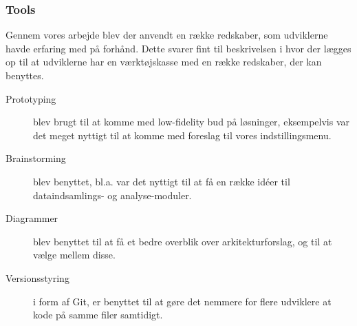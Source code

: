 \subsubsection{Tools}
Gennem vores arbejde blev der anvendt en række redskaber, som udviklerne havde erfaring med på forhånd.
Dette svarer fint til beskrivelsen i \citet[Kapitel 7]{book:softwareinnovation} hvor der lægges op til at udviklerne har en værktøjskasse med en række redskaber, der kan benyttes.

\begin{description}
	\item[Prototyping] blev brugt til at komme med low-fidelity bud på løsninger, eksempelvis var det meget nyttigt til at komme med foreslag til vores indstillingsmenu.
	\item[Brainstorming] blev benyttet, bl.a. var det nyttigt til at få en række idéer til dataindsamlings- og analyse-moduler.
	\item[Diagrammer] blev benyttet til at få et bedre overblik over arkitekturforslag, og til at vælge mellem disse.
	\item[Versionsstyring] i form af Git, er benyttet til at gøre det nemmere for flere udviklere at kode på samme filer samtidigt.
\end{description}